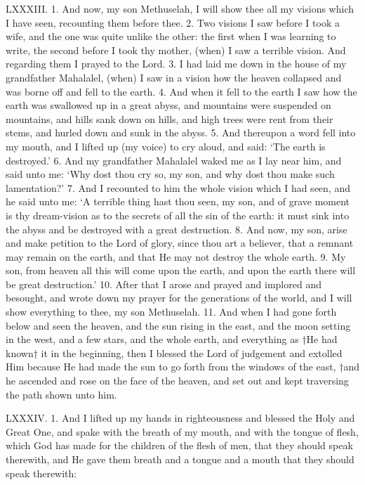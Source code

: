

LXXXIII. 1. And now, my son Methuselah, I
will show thee all my visions which I have seen,
recounting them before thee. 2. Two visions I saw
before I took a wife, and the one was quite unlike
the other: the first when I was learning to write,
the second before I took thy mother, (when) I saw a
terrible vision. And regarding them I prayed to the
Lord. 3. I had laid me down in the house of my
grandfather Mahalalel, (when) I saw in a vision how
the heaven collapsed and was borne off and fell to the
earth. 4. And when it fell to the earth I saw how
the earth was swallowed up in a great abyss, and
mountains were suspended on mountains, and hills
sank down on hills, and high trees were rent from their
stems, and hurled down and sunk in the abyss.
5. And thereupon a word fell into my mouth, and I
lifted up (my voice) to cry aloud, and said: ‘The
earth is destroyed.’ 6. And my grandfather Mahalalel
waked me as I lay near him, and said unto me:
‘Why dost thou cry so, my son, and why dost thou
make such lamentation?’ 7. And I recounted to him
the whole vision which I had seen, and he said unto
me: ‘A terrible thing hast thou seen, my son, and of
grave moment is thy dream-vision as to the secrets
of all the sin of the earth: it must sink into the abyss
and be destroyed with a great destruction. 8. And
now, my son, arise and make petition to the Lord of
glory, since thou art a believer, that a remnant may
remain on the earth, and that He may not destroy
the whole earth. 9. My son, from heaven all this will
come upon the earth, and upon the earth there will be
great destruction.’ 10. After that I arose and prayed
and implored and besought, and wrote down my
prayer for the generations of the world, and I will
show everything to thee, my son Methuselah. 11. And
when I had gone forth below and seen the heaven, and
the sun rising in the east, and the moon setting in the
west, and a few stars, and the whole earth, and everything
as †He had known† it in the beginning, then I
blessed the Lord of judgement and extolled Him because
He had made the sun to go forth from the
windows of the east, †and he ascended and rose on the
face of the heaven, and set out and kept traversing
the path shown unto him.

LXXXIV. 1. And I lifted up my hands in righteousness
and blessed the Holy and Great One, and
spake with the breath of my mouth, and with the
tongue of flesh, which God has made for the children
of the flesh of men, that they should speak therewith,
and He gave them breath and a tongue and a mouth
that they should speak therewith:

